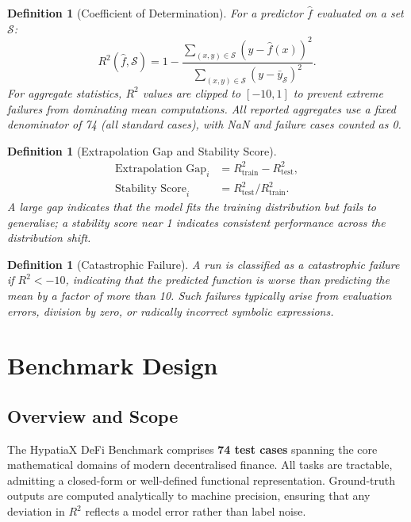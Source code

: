 \documentclass[twoside,11pt]{article}
\newcommand{\Rsq}{R^{2}}
\newcommand{\Rtrain}{R^{2}_{\mathrm{train}}}
\newcommand{\Rtest}{R^{2}_{\mathrm{test}}}
\newtheorem{definition}[theorem]{Definition}
\begin{document}
\begin{definition}[Coefficient of Determination]
For a predictor $\hat{f}$ evaluated on a set $\mathcal{S}$:
\begin{equation}
  \Rsq(\hat{f}, \mathcal{S}) = 1 - \frac{\sum_{(x,y)\in\mathcal{S}}(y - \hat{f}(x))^2}
                                         {\sum_{(x,y)\in\mathcal{S}}(y - \bar{y}_{\mathcal{S}})^2}.
  \label{eq:r2}
\end{equation}
For aggregate statistics, $\Rsq$ values are clipped to $[-10, 1]$ to prevent
extreme failures from dominating mean computations.  All reported aggregates use a
\emph{fixed denominator} of 74 (all standard cases), with NaN and failure cases
counted as 0.
\end{definition}

\begin{definition}[Extrapolation Gap and Stability Score]
\begin{align}
  \text{Extrapolation Gap}_i &= \Rtrain - \Rtest, \label{eq:gap}\\
  \text{Stability Score}_i   &= \Rtest / \Rtrain. \label{eq:stability}
\end{align}
A large gap indicates that the model fits the training distribution but fails
to generalise; a stability score near 1 indicates consistent performance across
the distribution shift.
\end{definition}

\begin{definition}[Catastrophic Failure]
A run is classified as a catastrophic failure if $\Rsq < -10$, indicating that
the predicted function is worse than predicting the mean by a factor of more
than 10.  Such failures typically arise from evaluation errors, division by
zero, or radically incorrect symbolic expressions.
\end{definition}

\section{Benchmark Design}
\label{sec:benchmark}

\subsection{Overview and Scope}

The HypatiaX DeFi Benchmark comprises \textbf{74 test cases} spanning the core
mathematical domains of modern decentralised finance.  All tasks are tractable,
admitting a closed-form or well-defined functional representation.  Ground-truth
outputs are computed analytically to machine precision, ensuring that any
deviation in $\Rsq$ reflects a model error rather than label noise.
\end{document}
